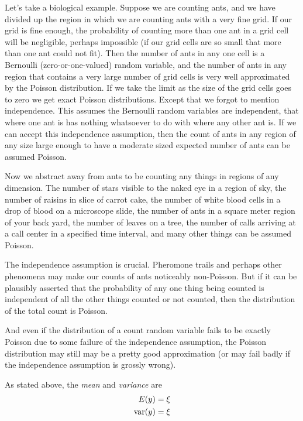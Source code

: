 Let's take a biological example.  Suppose we are counting ants, and we
have divided up the region in which we are counting ants with a very fine
grid.  If our grid is fine enough, the probability of counting more than one
ant in a grid cell will be negligible, perhaps impossible (if our grid cells
are so small that more than one ant could not fit).  Then the number of
ants in any one cell is a Bernoulli (zero-or-one-valued) random variable,
and the number of ants in any region that contains a very large number
of grid cells is very well approximated by the Poisson distribution.
If we take the limit as the size of the grid cells goes to zero we
get exact Poisson distributions.  Except that we forgot to mention
independence.  This assumes the Bernoulli random variables are independent,
that where one ant is has nothing whatsoever to do with where any other ant
is.  If we can accept this independence assumption, then the count of
ants in any region of any size large enough to have a moderate sized
expected number of ants can be assumed Poisson.

Now we abstract away from ants to be counting any things in regions of
any dimension.  The number of stars visible to the naked eye in a region
of sky, the number of raisins in slice of carrot cake, the number of white
blood cells in a drop of blood on a microscope slide, the number of ants
in a square meter region of your back yard, the number of leaves on a tree,
the number of calls arriving at a call center in a specified time interval,
and many other things can be assumed Poisson.

The independence assumption is crucial.  Pheromone trails and perhaps other
phenomena may make our counts of ants noticeably non-Poisson.  But if it
can be plausibly asserted that the probability of any one thing being counted
is independent of all the other things counted or not counted, then the
distribution of the total count is Poisson.

And even if the distribution of a count random variable fails to be exactly
Poisson due to some failure of the independence assumption, the Poisson
distribution may still may be a pretty good approximation (or may fail badly
if the independence assumption is grossly wrong).

As stated above, the \emph{mean} and \emph{variance} are
\begin{align*}
   E(y) & = \xi
   \\
   \operatorname{var}(y) & = \xi
\end{align*}

